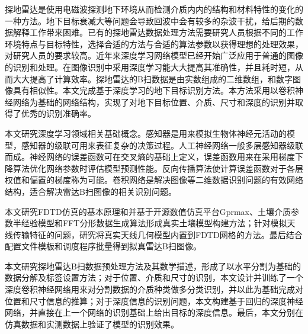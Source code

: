 	\begin{chineseabstract}
    探地雷达是使用电磁波探测地下环境从而检测介质内内的结构和材料特性的变化的一种方法。地下目标衰减大等问题会导致回波中会有较多的杂波干扰，给后期的数据解释工作带来困难。已有的探地雷达数据处理方法需要研究人员根据不同的工作环境特点与目标特性，选择合适的方法与合适的算法参数以获得理想的处理效果，对研究人员的要求较高。近年来深度学习网络模型已经开始广泛应用于普通的图像的识别和处理。在图像识别中采用深度学习能大大提高其准确性，并且耗时短，从而大大提高了计算效率。探地雷达的B扫数据是由实数组成的二维数组，和数字图像具有相似性。本文完成基于深度学习的地下目标识别方法。本方法采用以卷积神经网络为基础的网络结构，实现了对地下目标位置、介质、尺寸和深度的识别并取得了优秀的识别准确率。

    本文研究深度学习领域相关基础概念。感知器是用来模拟生物体神经元活动的模型，感知器的级联可用来表征复杂的决策过程。人工神经网络一般多层感知器级联而成。神经网络的误差函数可在交叉熵的基础上定义，误差函数用来在采用梯度下降算法优化网络参数时评估模型预测性能。反向传播算法使计算误差函数对于各层权值和偏置的梯度称为可能。卷积网络是解决图像等二维数据识别问题的有效网络结构，适合解决雷达B扫图像的相关识别问题。

    本文研究FDTD仿真的基本原理和并基于开源数值仿真平台Gprmax、土壤介质参数半经验模型和FFT分形数据生成算法形成真实土壤模型构建方法；针对模拟天线传输特征的问题，研究将真实天线几何模型内置到FDTD网格的方法。最后结合配置文件模板和调度程序批量得到拟真雷达B扫图像。

    本文研究探地雷达B扫数据预处理方法及其数学描述，形成了以水平分割为基础的数据分解及标签设置方法；对于位置、介质和尺寸的识别，本文设计并训练了一个深度卷积神经网络用来对分割数据的介质种类做多分类识别，并以此为基础完成对位置和尺寸信息的推算；对于深度信息的识别问题，本文构建基于回归的深度神经网络，并直接在上一个网络的识别基础上给出目标的深度信息。最后，本文分别在仿真数据和实测数据上验证了模型的识别效果。

\end{chineseabstract}

